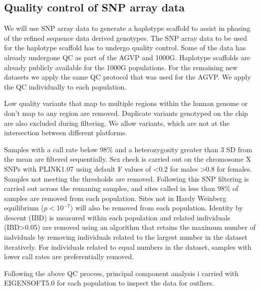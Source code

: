 \subsection{Quality control of SNP array data}
\label{sec:QCchip}
We will use SNP array data to generate a haplotype scaffold to assist in phasing of the refined sequence data derived genotypes. The SNP array data to be used for the haplotype scaffold has to undergo quality control. Some of the data has already undergone QC as part of the AGVP\cite{Gurdasani2015} and 1000G\cite{1000G2012}. Haplotype scaffolds are already publicly available for the 1000G populations. For the remaining new datasets we apply the same QC protocol that was used for the AGVP. We apply the QC individually to each population.

Low quality variants that map to multiple regions within the human genome or don't map to any region are removed. Duplicate variants genotyped on the chip are also excluded during filtering. We allow variants, which are not at the intersection between different platforms.

Samples with a call rate below 98\% and a heterozygosity greater than 3 SD from the mean are filtered sequentially. Sex check is carried out on the chromosome X SNPs with PLINK1.07 using default F values of \textless0.2 for males \textgreater0.8 for females. Samples not meeting the thresholds are removed. Following this SNP filtering is carried out across the remaning samples, and sites called in less than 98\% of samples are removed from each population. Sites not in Hardy Weinberg equilibrium ($p<10^{-7}$) will also be removed from each population. Identity by descent (IBD) is measured within each population and related individuals (IBD\textgreater0.05) are removed using an algorithm that retains the maximum number of indviduals by removing individuals related to the largest number in the dataset iteratively. For individuals related to equal numbers in the dataset, samples with lower call rates are preferentially removed.

Following the above QC process, principal component analysis i carried with EIGENSOFT5.0 for each population to inspect the data for outliers.